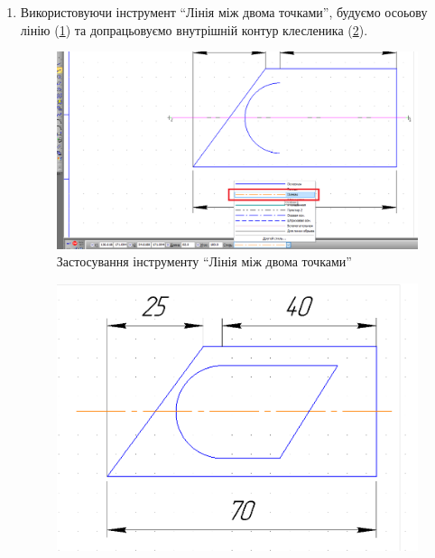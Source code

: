 \begin{enumerate}[leftmargin=*]
 \item Використовуючи інструмент ``Лінія між двома точками'', будуємо осоьову лінію
   (\ref{fig:lab3:central_line}) та допрацьовуємо внутрішній контур клесленика
   (\ref{fig:lab3:step6}).
   \begin{figure}[!ht]
     \centering
     \includegraphics[width=0.9\linewidth]{./images/lab3/step5.png}
     \caption{Застосування інструменту ``Лінія між двома точками''}
     \label{fig:lab3:central_line} 
   \end{figure}
   \begin{figure}[!ht]
     \centering
     \includegraphics[width=0.9\linewidth]{./images/lab3/step6.png}
     \caption{\label{fig:lab3:step6}}
   \end{figure}


\end{enumerate}
